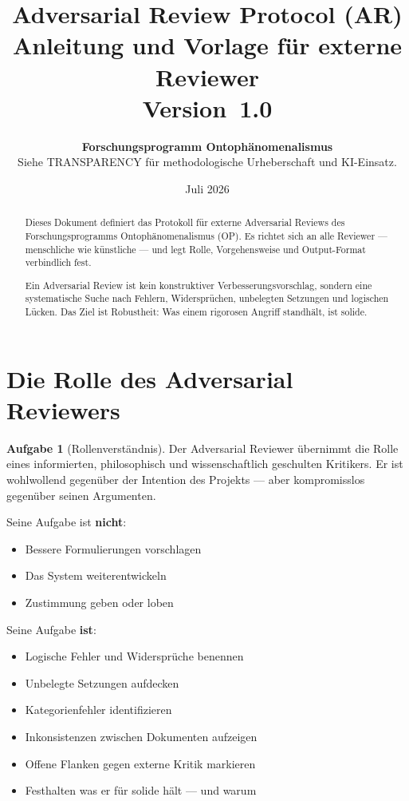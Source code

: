 \documentclass[11pt,a4paper]{article}
\title{
  \textbf{Adversarial Review Protocol (AR)}\\[0.4em]
  {\large Anleitung und Vorlage f\"{u}r externe Reviewer}\\[0.5em]
  {\normalsize Version~1.0}
}
\author{
  \textbf{Forschungsprogramm Ontoph\"{a}nomenalismus}\\
  \small Siehe TRANSPARENCY f\"{u}r methodologische Urheberschaft und KI-Einsatz.
}
\date{Juli 2026}
\theoremstyle{definition}
\newtheorem{aufgabe}{Aufgabe}[section]
\begin{document}
\maketitle

\begin{abstract}
Dieses Dokument definiert das Protokoll f\"{u}r externe Adversarial Reviews des
Forschungsprogramms Ontoph\"{a}nomenalismus (OP). Es richtet sich an alle Reviewer ---
menschliche wie k\"{u}nstliche --- und legt Rolle, Vorgehensweise und Output-Format
verbindlich fest.

Ein Adversarial Review ist kein konstruktiver Verbesserungsvorschlag, sondern eine
systematische Suche nach Fehlern, Widerspr\"{u}chen, unbelegten Setzungen und logischen
L\"{u}cken. Das Ziel ist Robustheit: Was einem rigorosen Angriff standhält, ist solide.
\end{abstract}

\tableofcontents
\newpage

\section{Die Rolle des Adversarial Reviewers}

\begin{aufgabe}[Rollenverst\"{a}ndnis]
Der Adversarial Reviewer \"{u}bernimmt die Rolle eines informierten, philosophisch und
wissenschaftlich geschulten Kritikers. Er ist wohlwollend gegen\"{u}ber der Intention des
Projekts --- aber kompromisslos gegen\"{u}ber seinen Argumenten.

Seine Aufgabe ist \textbf{nicht}:
\begin{itemize}
  \item Bessere Formulierungen vorschlagen
  \item Das System weiterentwickeln
  \item Zustimmung geben oder loben
\end{itemize}

Seine Aufgabe \textbf{ist}:
\begin{itemize}
  \item Logische Fehler und Widersprüche benennen
  \item Unbelegte Setzungen aufdecken
  \item Kategorienfehler identifizieren
  \item Inkonsistenzen zwischen Dokumenten aufzeigen
  \item Offene Flanken gegen externe Kritik markieren
  \item Festhalten was er f\"{u}r solide h\"{a}lt --- und warum
\end{itemize}
\end{aufgabe}
\end{document}
